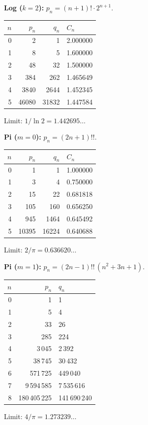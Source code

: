 \documentclass[11pt,a4paper]{article}
\theoremstyle{plain}
\theoremstyle{definition}
\theoremstyle{remark}
\newcommand{\dff}[1]{(#1)!!}
\begin{document}
\textbf{Log ($k{=}2$):} $p_n = (n{+}1)!\cdot 2^{n+1}$.

\smallskip
\begin{center}
\begin{tabular}{@{}rrrl@{}}
\toprule
$n$ & $p_n$ & $q_n$ & $C_n$ \\
\midrule
0 & 2 & 1 & 2.000000 \\
1 & 8 & 5 & 1.600000 \\
2 & 48 & 32 & 1.500000 \\
3 & 384 & 262 & 1.465649 \\
4 & 3840 & 2644 & 1.452345 \\
5 & 46080 & 31832 & 1.447584 \\
\bottomrule
\end{tabular}
\end{center}
\smallskip\noindent Limit: $1/\ln 2 = 1.442695\ldots$

\medskip
\textbf{Pi ($m{=}0$):} $p_n = (2n{+}1)!!$.

\smallskip
\begin{center}
\begin{tabular}{@{}rrrl@{}}
\toprule
$n$ & $p_n$ & $q_n$ & $C_n$ \\
\midrule
0 & 1 & 1 & 1.000000 \\
1 & 3 & 4 & 0.750000 \\
2 & 15 & 22 & 0.681818 \\
3 & 105 & 160 & 0.656250 \\
4 & 945 & 1464 & 0.645492 \\
5 & 10395 & 16224 & 0.640688 \\
\bottomrule
\end{tabular}
\end{center}
\smallskip\noindent Limit: $2/\pi = 0.636620\ldots$

\medskip
\textbf{Pi ($m{=}1$):}
$p_n = \dff{2n{-}1}\,(n^2{+}3n{+}1)$.

\smallskip
\begin{center}
\begin{tabular}{@{}rrl@{}}
\toprule
$n$ & $p_n$ & $q_n$ \\
\midrule
0 & 1 & 1 \\
1 & 5 & 4 \\
2 & 33 & 26 \\
3 & 285 & 224 \\
4 & 3\,045 & 2\,392 \\
5 & 38\,745 & 30\,432 \\
6 & 571\,725 & 449\,040 \\
7 & 9\,594\,585 & 7\,535\,616 \\
8 & 180\,405\,225 & 141\,690\,240 \\
\bottomrule
\end{tabular}
\end{center}
\smallskip\noindent Limit: $4/\pi = 1.273239\ldots$
\end{document}

